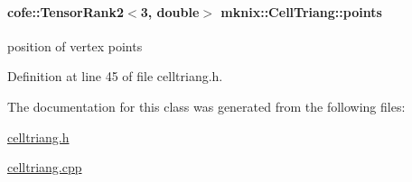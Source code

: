 \paragraph[{points}]{\setlength{\rightskip}{0pt plus 5cm}cofe\+::\+Tensor\+Rank2$<$3, double$>$ mknix\+::\+Cell\+Triang\+::points\hspace{0.3cm}{\ttfamily [protected]}}\label{classmknix_1_1_cell_triang_a22bff969ea4955bd817c94ae2915e60c}
position of vertex points 

Definition at line 45 of file celltriang.\+h.



The documentation for this class was generated from the following files\+:\begin{DoxyCompactItemize}
\item 
\hyperlink{celltriang_8h}{celltriang.\+h}\item 
\hyperlink{celltriang_8cpp}{celltriang.\+cpp}\end{DoxyCompactItemize}
